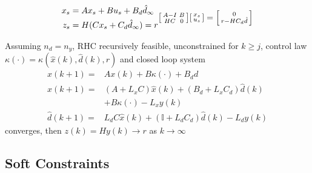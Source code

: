 \begin{align*}
	\begin{aligned}
		x_s & = Ax_s + Bu_s +B_d\hat{d}_\infty  \\
		z_s & = H(Cx_s + C_d\hat{d}_\infty) = r
	\end{aligned}
	\begin{aligned}
		\begin{bsmallmatrix}
			A-I & B \\
			HC  & 0
		\end{bsmallmatrix}
		\begin{bsmallmatrix}
			x_s \\
			u_s
		\end{bsmallmatrix}
		=
		\begin{bsmallmatrix}
			0 \\
			r-HC_d\hat{d}
		\end{bsmallmatrix}
	\end{aligned}
\end{align*}


\begin{theorem}
	Assuming
	$n_d = n_y$,
	RHC recursively feasible,
	unconstrained for $k \geq j$,
	control law  $\kappa(\cdot)= \kappa(\hat{x}(k),\hat{d}(k),r)$
	and closed loop system
	\begin{align*}
		x(k+1)        = & Ax(k) + B\kappa(\cdot) + B_d d                                 \\
		\hat{x}(k+1)  = & (A + L_x C)\hat{x}(k) + (B_d + L_x C_d)\hat{d}(k)              \\
		                & + B\kappa(\cdot) - L_x y(k)                                    \\
		\hat{d}(k+1)  = & L_d C \hat{x}(k) + (\mathbb{I} + L_d C_d)\hat{d}(k) - L_d y(k)
	\end{align*}
	converges, then $z(k) = Hy(k) \to r$
	as $k\to\infty$
\end{theorem}



\subsection{Soft Constraints}

